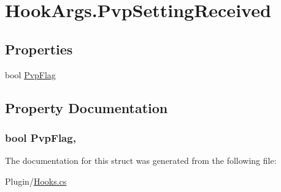 \hypertarget{structOTA_1_1Plugin_1_1HookArgs_1_1PvpSettingReceived}{}\section{Hook\+Args.\+Pvp\+Setting\+Received}
\label{structOTA_1_1Plugin_1_1HookArgs_1_1PvpSettingReceived}
\subsection*{Properties}
\begin{DoxyCompactItemize}
\item 
bool \hyperlink{structOTA_1_1Plugin_1_1HookArgs_1_1PvpSettingReceived_ac363c3b2a107e53896056fc8b78d6b05}{Pvp\+Flag}
\end{DoxyCompactItemize}


\subsection{Property Documentation}
\hypertarget{structOTA_1_1Plugin_1_1HookArgs_1_1PvpSettingReceived_ac363c3b2a107e53896056fc8b78d6b05}{}
\subsubsection[{Pvp\+Flag}]{\setlength{\rightskip}{0pt plus 5cm}bool Pvp\+Flag\hspace{0.3cm}{\ttfamily [get]}, {\ttfamily [set]}}\label{structOTA_1_1Plugin_1_1HookArgs_1_1PvpSettingReceived_ac363c3b2a107e53896056fc8b78d6b05}


The documentation for this struct was generated from the following file\+:\begin{DoxyCompactItemize}
\item 
Plugin/\hyperlink{Hooks_8cs}{Hooks.\+cs}\end{DoxyCompactItemize}
